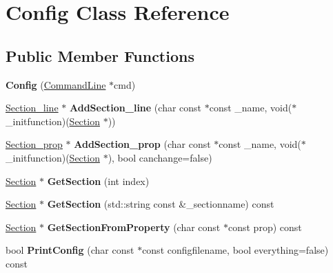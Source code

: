 \hypertarget{classConfig}{\section{Config Class Reference}
\label{classConfig}
}
\subsection*{Public Member Functions}
\begin{DoxyCompactItemize}
\item 
\hypertarget{classConfig_a526e7d065ca0a508ff66e18d9efdeda1}{{\bfseries Config} (\hyperlink{classCommandLine}{Command\-Line} $\ast$cmd)}\label{classConfig_a526e7d065ca0a508ff66e18d9efdeda1}

\item 
\hypertarget{classConfig_ace2cc0065844f72d35fa7fffbf842980}{\hyperlink{classSection__line}{Section\-\_\-line} $\ast$ {\bfseries Add\-Section\-\_\-line} (char const $\ast$const \-\_\-name, void($\ast$\-\_\-initfunction)(\hyperlink{classSection}{Section} $\ast$))}\label{classConfig_ace2cc0065844f72d35fa7fffbf842980}

\item 
\hypertarget{classConfig_aaa6ac4037e69d8284fe1b4e6c4c682e5}{\hyperlink{classSection__prop}{Section\-\_\-prop} $\ast$ {\bfseries Add\-Section\-\_\-prop} (char const $\ast$const \-\_\-name, void($\ast$\-\_\-initfunction)(\hyperlink{classSection}{Section} $\ast$), bool canchange=false)}\label{classConfig_aaa6ac4037e69d8284fe1b4e6c4c682e5}

\item 
\hypertarget{classConfig_a91af5d9f5cf8c53581eaeb0cb104ff5f}{\hyperlink{classSection}{Section} $\ast$ {\bfseries Get\-Section} (int index)}\label{classConfig_a91af5d9f5cf8c53581eaeb0cb104ff5f}

\item 
\hypertarget{classConfig_a873c20a35c7320de62b6ad759b825302}{\hyperlink{classSection}{Section} $\ast$ {\bfseries Get\-Section} (std\-::string const \&\-\_\-sectionname) const }\label{classConfig_a873c20a35c7320de62b6ad759b825302}

\item 
\hypertarget{classConfig_abea967e8168d80ecb600891d62a2f534}{\hyperlink{classSection}{Section} $\ast$ {\bfseries Get\-Section\-From\-Property} (char const $\ast$const prop) const }\label{classConfig_abea967e8168d80ecb600891d62a2f534}

\item 
\hypertarget{classConfig_a5358d65e6687f76a7856aae7b5bf0c5c}{bool {\bfseries Print\-Config} (char const $\ast$const configfilename, bool everything=false) const }\label{classConfig_a5358d65e6687f76a7856aae7b5bf0c5c}


\end{DoxyCompactItemize}
